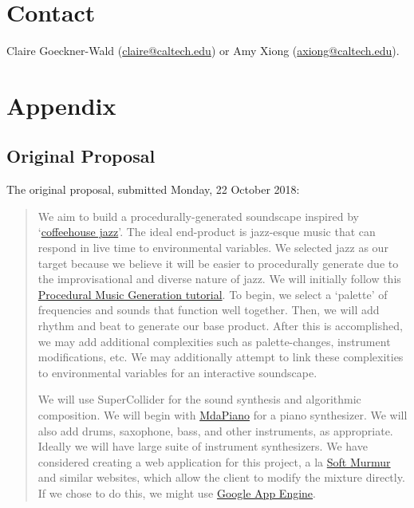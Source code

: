 \documentclass[12pt,a4paper]{article}
\begin{document}
\section{Contact}

Claire Goeckner-Wald (\href{mailto://claire@caltech.edu}{claire@caltech.edu}) or Amy Xiong (\href{mailto://axiong@caltech.edu}{axiong@caltech.edu}).

\section{Appendix}

\subsection{Original Proposal}
The original proposal, submitted Monday, 22 October 2018:
\begin{quote}
We aim to build a procedurally-generated soundscape inspired by `\href{https://www.youtube.com/watch?v=K2Q6YO3Ez44}{coffeehouse jazz}'. The ideal end-product is jazz-esque music that can respond in live time to environmental variables. We selected jazz as our target because we believe it will be easier to procedurally generate due to the improvisational and diverse nature of jazz. We will initially follow this \href{http://www.procjam.com/tutorials/en/music/}{Procedural Music Generation tutorial}. To begin, we select a `palette' of frequencies and sounds that function well together. Then, we will add rhythm and beat to generate our base product. After this is accomplished, we may add additional complexities such as palette-changes, instrument modifications, etc. We may additionally attempt to link these complexities to environmental variables for an interactive soundscape.

We will use SuperCollider for the sound synthesis and algorithmic composition. We will begin with \href{http://doc.sccode.org/Classes/MdaPiano.html}{MdaPiano} for a piano synthesizer. We will also add drums, saxophone, bass, and other instruments, as appropriate. Ideally we will have large suite of instrument synthesizers. We have considered creating a web application for this project, a la \href{https://asoftmurmur.com/}{Soft Murmur} and similar websites, which allow the client to modify the mixture directly. If we chose to do this, we might use \href{https://console.cloud.google.com/projectselector/appengine}{Google App Engine}.
\end{quote}
\end{document}
